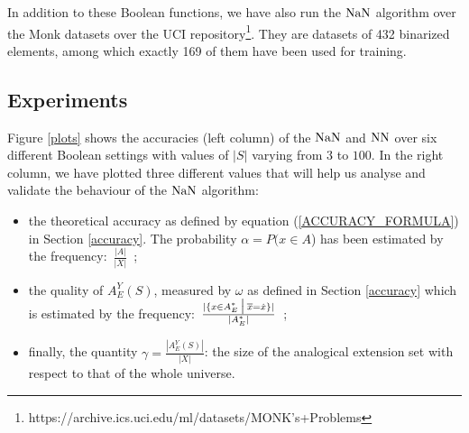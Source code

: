 In addition to these Boolean functions, we have also run the $\NaN$ algorithm
over the Monk datasets over the UCI
repository\footnote{https://archive.ics.uci.edu/ml/datasets/MONK's+Problems}.
They are datasets of 432 binarized elements, among which exactly 169 of them
have been used for training.

\subsection{Experiments}

Figure \ref{plots} shows the accuracies (left column) of the $\NaN$ and $\NN$
over six different Boolean settings with values of $|S|$ varying from $3$ to
$100$. In the right column, we have plotted three different values that will
help us analyse and validate the behaviour of the
$\NaN$ algorithm:
\begin{itemize}
  \item the theoretical accuracy as defined by equation
    (\ref{ACCURACY_FORMULA})
    in Section \ref{accuracy}. The probability $\alpha = P(x \in A$) has been
    estimated by the frequency:~$\frac{|A|}{|X|}$~;
  \item the quality of $A_E^Y(S)$, measured by $\omega$ as defined in Section
    \ref{accuracy} which is estimated by the frequency:~$\frac{|\{x \in A_E^*
    \given[\big] \albl{x} = \dot{x}\}|}{|A_E^*|}$~;
\item finally, the
    quantity $\gamma = \frac{|A_E^Y(S)|}{|X|}$: the size of
    the analogical extension set with respect to that of the whole universe.
\end{itemize}

